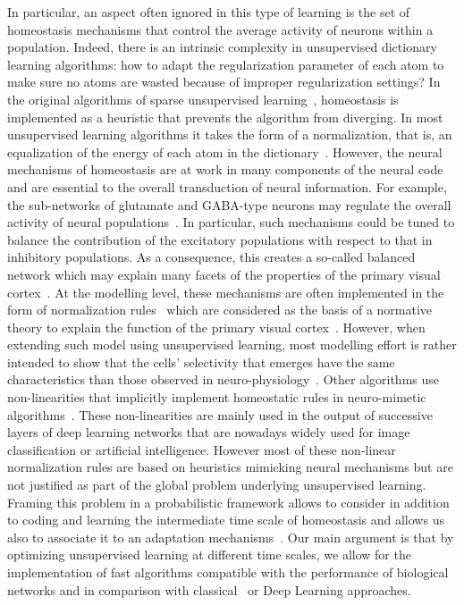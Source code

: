 \documentclass[draft]{article} %
\begin{document}
In particular, an aspect often ignored in this type of learning is the set of homeostasis mechanisms that control the average  activity of neurons within a population. Indeed, there is an intrinsic complexity in unsupervised dictionary learning algorithms: how to adapt the regularization parameter of each atom to make sure no atoms are wasted because of improper regularization settings? In the original algorithms of sparse unsupervised learning~\citep{Olshausen97}, homeostasis is implemented as a heuristic that prevents the algorithm from diverging. In most unsupervised learning algorithms it takes the form of a normalization, that is, an equalization of the energy of each atom in the dictionary~\citep{Mairal14}. However, the neural mechanisms of homeostasis are at work in many components of the neural code and are essential to the overall transduction of neural information. For example, the sub-networks of glutamate and GABA-type neurons may regulate the overall activity of neural populations~\citep{Marder2006variability}. In particular, such mechanisms could be tuned to balance the contribution of the excitatory populations with respect to that in inhibitory populations. As a consequence, this creates a so-called balanced network which may explain many facets of the properties of the primary visual cortex~\citep{Hansel12}. At the modelling level, these mechanisms are often implemented in the form of normalization rules~\citep{Schwartz01} which are considered as the basis of a normative theory to explain the function of the primary visual cortex~\citep{Carandini12}. However, when extending such model using unsupervised learning, most modelling effort is rather intended to show that the cells' selectivity that emerges have the same characteristics than those observed in neuro-physiology~\citep{Ringach02,Rehn07, Loxley17}. Other algorithms use non-linearities that implicitly implement homeostatic rules in neuro-mimetic algorithms~\citep{Brito16}. These non-linearities are mainly used in the output of successive layers of deep learning networks that are nowadays widely used for image classification or artificial intelligence. However most of these non-linear normalization rules are based on heuristics mimicking neural mechanisms but are not justified as part of the global problem underlying unsupervised learning. Framing this problem in a probabilistic framework allows to consider in addition to coding and learning the intermediate time scale of homeostasis and allows us also to associate it to an adaptation mechanisms~\citep{Rao99}. Our main argument is that by optimizing unsupervised learning at different time scales, we allow for the implementation of fast algorithms compatible with the performance of biological networks and in comparison with classical~\citep{Olshausen97} or Deep Learning approaches.
\end{document}
